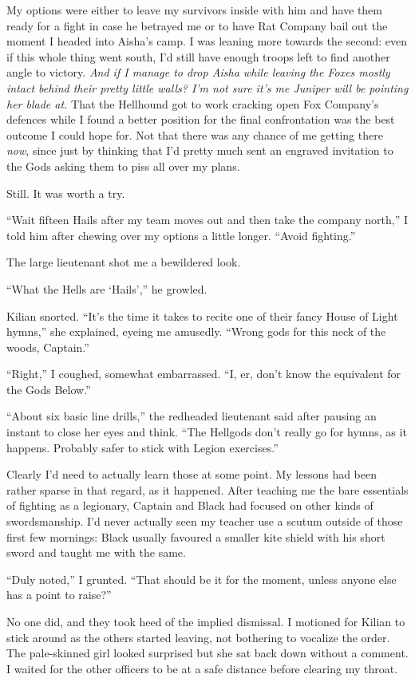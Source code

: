\documentclass[12pt, openany]{book}
\begin{document}
My options were either to leave my survivors inside with him and have them ready for a fight in case he betrayed me or to have Rat Company bail out the moment I headed into Aisha’s camp. I was leaning more towards the second: even if this whole thing went south, I’d still have enough troops left to find another angle to victory. \textit{And if I manage to drop Aisha while leaving the Foxes mostly intact behind their pretty little walls? I’m not sure it’s me Juniper will be pointing her blade at.} That the Hellhound got to work cracking open Fox Company’s defences while I found a better position for the final confrontation was the best outcome I could hope for. Not that there was any chance of me getting there \textit{now}, since just by thinking that I’d pretty much sent an engraved invitation to the Gods asking them to piss all over my plans.

Still. It was worth a try.

“Wait fifteen Hails after my team moves out and then take the company north,” I told him after chewing over my options a little longer. “Avoid fighting.”

The large lieutenant shot me a bewildered look.

“What the Hells are ‘Hails’,” he growled.

Kilian snorted. “It’s the time it takes to recite one of their fancy House of Light hymns,” she explained, eyeing me amusedly. “Wrong gods for this neck of the woods, Captain.”

“Right,” I coughed, somewhat embarrassed. “I, er, don’t know the equivalent for the Gods Below.”

“About six basic line drills,” the redheaded lieutenant said after pausing an instant to close her eyes and think. “The Hellgods don’t really go for hymns, as it happens. Probably safer to stick with Legion exercises.”

Clearly I’d need to actually learn those at some point. My lessons had been rather sparse in that regard, as it happened. After teaching me the bare essentials of fighting as a legionary, Captain and Black had focused on other kinds of swordsmanship. I’d never actually seen my teacher use a scutum outside of those first few mornings: Black usually favoured a smaller kite shield with his short sword and taught me with the same.

“Duly noted,” I grunted. “That should be it for the moment, unless anyone else has a point to raise?”

No one did, and they took heed of the implied dismissal. I motioned for Kilian to stick around as the others started leaving, not bothering to vocalize the order. The pale-skinned girl looked surprised but she sat back down without a comment. I waited for the other officers to be at a safe distance before clearing my throat.
\end{document}
